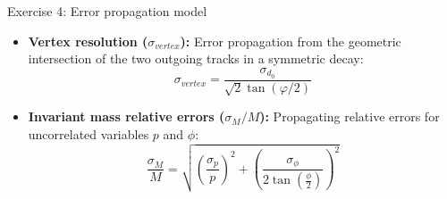 \begin{frame}{Exercise 4: Error propagation model}
    \begin{itemize}
        \item \textbf{Vertex resolution ($\sigma_{vertex}$):} Error propagation from the geometric intersection of the two outgoing tracks in a symmetric decay:
    $$ \sigma_{vertex} = \frac{\sigma_{d_0}}{\sqrt{2}\tan(\varphi/2)} $$
        \item \textbf{Invariant mass relative errors ($\sigma_M/M$):} Propagating relative errors for uncorrelated variables $p$ and $\phi$:
        $$ \frac{\sigma_M}{M} = \sqrt{\left(\frac{\sigma_p}{p}\right)^2 + \left(\frac{\sigma_\phi}{2 \tan\left(\frac{\phi}{2}\right)}\right)^2} $$
    \end{itemize}
\end{frame}

